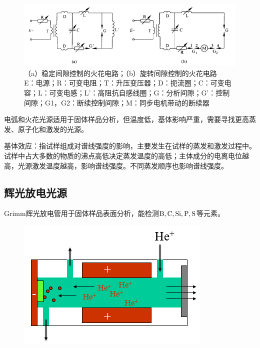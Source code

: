 \begin{figure}[!h]
	\centering
	\includegraphics[width=0.7\linewidth]{image/chp8_circuit_diagram3}
	\caption{（a）稳定间隙控制的火花电路；（b）旋转间隙控制的火花电路\\
		E：电源；R：可变电阻；T：升压变压器；D：扼流圈；C：可变电容；L：可变电感；L’：高阻抗自感线圈；G：分析间隙；G’：控制间隙；G1，G2：断续控制间隙；M：同步电机带动的断续器}
	\label{fig:chp8circuitdiagram3}
\end{figure}

电弧和火花光源适用于固体样品分析，但温度低，基体影响严重，需要寻找更高蒸发、原子化和激发的光源。

\begin{note}
	基体效应：指试样组成对谱线强度的影响，主要发生在试样的蒸发和激发过程中。试样中占大多数的物质的沸点高低决定蒸发温度的高低；主体成分的电离电位越高，光源激发温度越高，影响谱线强度。不同蒸发顺序也影响谱线强度。
\end{note}

\subsection{辉光放电光源}
Grimm辉光放电管用于固体样品表面分析，能检测$\ce{B,C,Si,P,S}$等元素。

\begin{figure}[!h]
	\centering
	\includegraphics[width=0.6\linewidth]{image/chp8_huiguang}
	\label{fig:chp8huiguang}
\end{figure}


